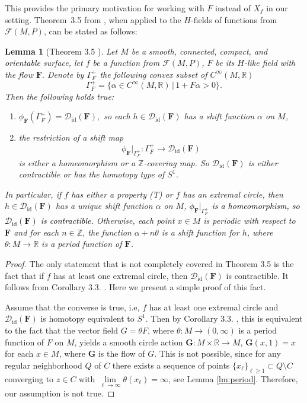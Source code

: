 \documentclass[10pt,reqno]{amsart}
\newtheorem{lemma}[subsection]{Lemma}
\newcommand{\bbR}{\mathbb{R}}
\newcommand{\bbZ}{\mathbb{Z}}
\newcommand{\bfF}{\mathbf{F}}
\newcommand{\F}{\mathcal{F}(M,P)}
\newcommand{\id}{\mathrm{id}}
\newcommand{\textr}[1]{\textcolor{black}{#1}}
\begin{document}
This provides the primary motivation for working with $F$ instead of $X_f$ in our setting. Theorem~3.5 from \cite{Maksymenko:OsakaJM:2011}, when applied to the $H$-fields of functions from $\F$, can be stated as follows:
\begin{lemma}[Theorem 3.5 \cite{Maksymenko:OsakaJM:2011}]\label{lm:hom-type-Did}
	Let $M$ be a smooth, connected, compact, and  \textr{orientable} surface, 
	let $f$ be a function from $\F$, $F$ be its $H$-like field with the flow $\mathbf{F}.$  
	Denote by $\Gamma_F^+$ the following convex subset of $C^{\infty}(M,\bbR)$
	$$
	\Gamma_F^+ = \{ \alpha\in C^{\infty}(M,\bbR)\,|\, 1+F\alpha>0 \}.
	$$
	Then the following holds true:
	\begin{enumerate}
		\item $\phi_{\bfF}(\Gamma^+_F) = \mathcal{D}_{\id}(\bfF),$ so each $h\in\mathcal{D}_{\id}(\bfF)$ has a shift function  $\alpha$ on $M$,
		\item  the restriction of a shift map 
		$$
		\phi_{\bfF}|_{\Gamma^+_F}:\Gamma^+_F\to \mathcal{D}_{\id}(\bfF)
		$$
		is either a homeomorphism  or a $\bbZ$-covering map. So $\mathcal{D}_{\id}(\bfF)$ is either contractible or has the homotopy type of $S^1$.
	\end{enumerate}
	In particular,
	if $f$ has either a property {\rm(T)} or $f$ has an extremal circle, then  $h\in\mathcal{D}_{\id}(\bfF)$ has a unique shift function $\alpha$ on $M$, \textr{$\phi_{\bfF}|_{\Gamma^+_F}$ is a homeomorphism, so 
	$\mathcal{D}_{\id}(\bfF)$ is contractible. }
	Otherwise, each point  $x\in M$ is periodic with respect to $\bfF$ and for each $n\in \bbZ$, the function $\alpha+n\theta$ is a shift function for $h$, where $\theta:M\to \bbR$ is a period function of $\bfF$.
\end{lemma}
\begin{proof}
	The only statement that is not completely covered in Theorem 3.5 \cite{Maksymenko:OsakaJM:2011} is the fact that if $f$ has at least one extremal circle, then $\mathcal{D}_{\id}(\bfF)$ is contractible. It follows from  Corollary 3.3. \cite{Maks:reparam-sh-map}.
	Here we present a simple proof of this fact.
	 


	Assume that the converse is true, i.e, $f$ has at least one extremal circle and $\mathcal{D}_{\id}(\bfF)$ is homotopy equivalent to $S^1$. Then
	 by Corollary 3.3. \cite{Maks:reparam-sh-map}, this is equivalent to the fact that the vector field $G = \theta F$, where $\theta:M\to (0,\infty)$ is a period function of $F$ on $M$, yields a smooth circle action $\mathbf{G}:M\times\bbR\to M$, $\mathbf{G}(x,1) = x$ for each $x\in M$, where $\mathbf{G}$  is the flow of $G$.
	 This is not possible, since  for any regular neighborhood $Q$ of $C$ there exists a sequence of points $\{x_{\ell}\}_{\ell\geq 1}\subset Q\setminus C$ converging to $z\in C$ with $\lim\limits_{\ell\to \infty}\theta(x_{\ell}) = \infty$, see Lemma \ref{lm:period}.
	Therefore, our assumption is not true. 
\end{proof}
\end{document}
